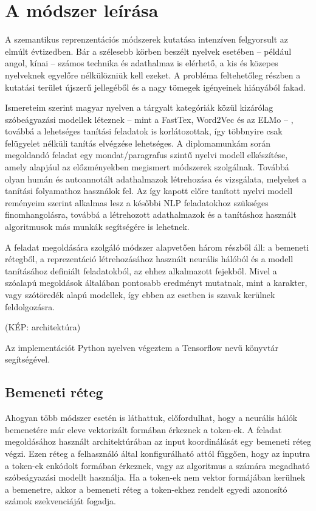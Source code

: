 \chapter{A módszer leírása}
\label{ch:method}

A szemantikus reprenzentációs módszerek kutatása intenzíven felgyorsult az elmúlt évtizedben. Bár a szélesebb körben beszélt nyelvek esetében – például angol, kínai – számos technika és adathalmaz is elérhető, a kis és közepes nyelveknek egyelőre nélkülözniük kell ezeket. A probléma  feltehetőleg részben a kutatási terület újszerű jellegéből és a nagy tömegek igényeinek hiányából fakad. 

Ismereteim szerint magyar nyelven a tárgyalt kategóriák közül kizárólag szóbeágyazási modellek léteznek – mint a FastTex, Word2Vec és az ELMo – , továbbá a lehetséges tanítási feladatok is korlátozottak, így többnyire csak felügyelet nélküli tanítás elvégzése lehetséges. A diplomamunkám során megoldandó feladat egy mondat/paragrafus szintű nyelvi modell elkészítése, amely alapjául az előzményekben megismert módszerek szolgálnak. Továbbá olyan humán és autoannotált adathalmazok létrehozása és vizsgálata, melyeket a tanítási folyamathoz használok fel. Az így kapott előre tanított nyelvi modell reményeim szerint alkalmas lesz a későbbi NLP feladatokhoz szükséges finomhangolásra, továbbá a létrehozott adathalmazok és a tanításhoz használt algoritmusok más munkák segítségére is lehetnek.

A feladat megoldására szolgáló módszer alapvetően három részből áll: a bemeneti rétegből, a reprezentáció létrehozásához használt neurális hálóból és a modell tanításához definiált feladatokból, az ehhez alkalmazott fejekből. Mivel a szóalapú megoldások általában pontosabb eredményt mutatnak, mint a karakter, vagy szótöredék alapú modellek, így ebben az esetben is szavak kerülnek feldolgozásra.

(KÉP: architektúra)

Az implementációt Python nyelven végeztem a Tensorflow nevű könyvtár segítségével.

\section{Bemeneti réteg}

Ahogyan több módszer esetén is láthattuk, előfordulhat, hogy a neurális hálók bemenetére már eleve vektorizált formában érkeznek a token-ek. A feladat megoldásához használt architektúrában az input koordinálását egy bemeneti réteg végzi. Ezen réteg a felhasználó által konfigurálható attól függően, hogy az inputra a token-ek enkódolt formában érkeznek, vagy az algoritmus a számára megadható szóbeágyazási modellt használja. Ha a token-ek nem vektor formájában kerülnek a bemenetre, akkor a bemeneti réteg a token-ekhez rendelt egyedi azonosító számok szekvenciáját fogadja.

